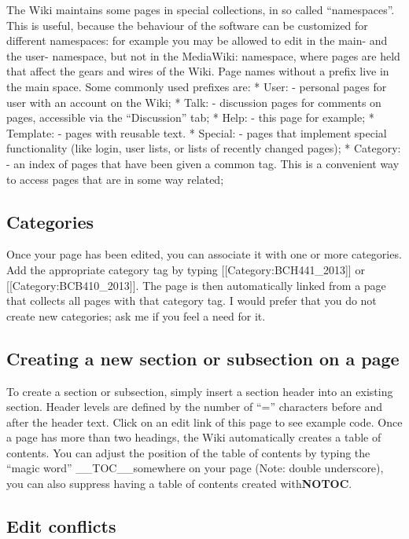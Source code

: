 \documentclass[]{book}
\begin{document}
The Wiki maintains some pages in special collections, in so called
``namespaces''. This is useful, because the behaviour of the software
can be customized for different namespaces: for example you may be
allowed to edit in the main- and the user- namespace, but not in the
MediaWiki: namespace, where pages are held that affect the gears and
wires of the Wiki. Page names without a prefix live in the main space.
Some commonly used prefixes are: * User: - personal pages for user with
an account on the Wiki; * Talk: - discussion pages for comments on
pages, accessible via the ``Discussion'' tab; * Help: - this page for
example; * Template: - pages with reusable text. * Special: - pages that
implement special functionality (like login, user lists, or lists of
recently changed pages); * Category: - an index of pages that have been
given a common tag. This is a convenient way to access pages that are in
some way related;

\subsection{Categories}\label{categories}

Once your page has been edited, you can associate it with one or more
categories. Add the appropriate category tag by typing
{[}{[}Category:BCH441\_2013{]}{]} or {[}{[}Category:BCB410\_2013{]}{]}.
The page is then automatically linked from a page that collects all
pages with that category tag. I would prefer that you do not create new
categories; ask me if you feel a need for it.

\subsection{Creating a new section or subsection on a
page}\label{creating-a-new-section-or-subsection-on-a-page}

To create a section or subsection, simply insert a section header into
an existing section. Header levels are defined by the number of ``=''
characters before and after the header text. Click on an edit link of
this page to see example code. Once a page has more than two headings,
the Wiki automatically creates a table of contents. You can adjust the
position of the table of contents by typing the ``magic word''
\_\_TOC\_\_somewhere on your page (Note: double underscore), you can
also suppress having a table of contents created with\textbf{NOTOC}.

\subsection{Edit conflicts}\label{edit-conflicts}
\end{document}
